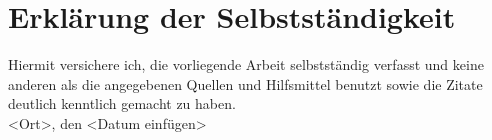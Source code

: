 \thispagestyle{empty}

%


\chapter*{Erklärung der Selbstständigkeit}
%
Hiermit versichere ich, die vorliegende Arbeit selbstständig verfasst und keine
anderen als die angegebenen Quellen und Hilfsmittel benutzt sowie die Zitate
deutlich kenntlich gemacht zu haben.
%
\vspace{4\baselineskip}\\
%
<Ort>, den <Datum einfügen> 

\clearpage\mbox{}\thispagestyle{empty}

